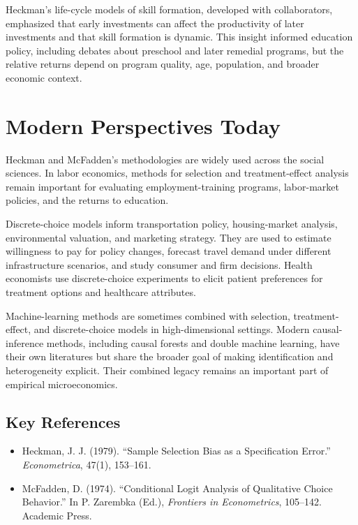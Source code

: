 Heckman's life-cycle models of skill formation, developed with collaborators,
emphasized that early investments can affect the productivity of later investments
and that skill formation is dynamic. This insight informed education policy,
including debates about preschool and later remedial programs, but the relative
returns depend on program quality, age, population, and broader economic context.

\section{Modern Perspectives Today}
Heckman and McFadden's methodologies are widely used across the social sciences.
In labor economics, methods for selection and treatment-effect analysis remain
important for evaluating employment-training programs, labor-market policies, and
the returns to education.

Discrete-choice models inform transportation policy, housing-market analysis,
environmental valuation, and marketing strategy. They are used to estimate
willingness to pay for policy changes, forecast travel demand under different
infrastructure scenarios, and study consumer and firm decisions. Health
economists use discrete-choice experiments to elicit patient preferences for
treatment options and healthcare attributes.

Machine-learning methods are sometimes combined with selection, treatment-effect,
and discrete-choice models in high-dimensional settings. Modern causal-inference
methods, including causal forests and double machine learning, have their own
literatures but share the broader goal of making identification and heterogeneity
explicit. Their combined legacy remains an important part of empirical
microeconomics.

\subsection*{Key References}
\begin{itemize}
    \item Heckman, J. J. (1979). ``Sample Selection Bias as a Specification Error.'' \textit{Econometrica}, 47(1), 153--161.
    \item McFadden, D. (1974). ``Conditional Logit Analysis of Qualitative Choice Behavior.'' In P. Zarembka (Ed.), \textit{Frontiers in Econometrics}, 105--142. Academic Press.
\end{itemize}
